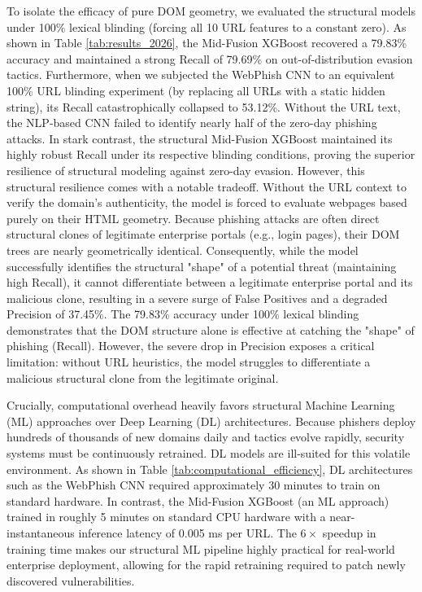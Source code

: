\documentclass[conference]{IEEEtran}
\begin{document}
To isolate the efficacy of pure DOM geometry, we evaluated the structural models under 100\% lexical blinding (forcing all 10 URL features to a constant zero). As shown in Table \ref{tab:results_2026}, the Mid-Fusion XGBoost recovered a 79.83\% accuracy and maintained a strong Recall of 79.69\% on out-of-distribution evasion tactics. Furthermore, when we subjected the WebPhish CNN to an equivalent 100\% URL blinding experiment (by replacing all URLs with a static hidden string), its Recall catastrophically collapsed to 53.12\%. Without the URL text, the NLP-based CNN failed to identify nearly half of the zero-day phishing attacks. In stark contrast, the structural Mid-Fusion XGBoost maintained its highly robust Recall under its respective blinding conditions, proving the superior resilience of structural modeling against zero-day evasion. However, this structural resilience comes with a notable tradeoff. Without the URL context to verify the domain's authenticity, the model is forced to evaluate webpages based purely on their HTML geometry. Because phishing attacks are often direct structural clones of legitimate enterprise portals (e.g., login pages), their DOM trees are nearly geometrically identical. Consequently, while the model successfully identifies the structural "shape" of a potential threat (maintaining high Recall), it cannot differentiate between a legitimate enterprise portal and its malicious clone, resulting in a severe surge of False Positives and a degraded Precision of 37.45\%. The 79.83\% accuracy under 100\% lexical blinding demonstrates that the DOM structure alone is effective at catching the "shape" of phishing (Recall). However, the severe drop in Precision exposes a critical limitation: without URL heuristics, the model struggles to differentiate a malicious structural clone from the legitimate original.

Crucially, computational overhead heavily favors structural Machine Learning (ML) approaches over Deep Learning (DL) architectures. Because phishers deploy hundreds of thousands of new domains daily and tactics evolve rapidly, security systems must be continuously retrained. DL models are ill-suited for this volatile environment. As shown in Table \ref{tab:computational_efficiency}, DL architectures such as the WebPhish CNN required approximately 30 minutes to train on standard hardware. In contrast, the Mid-Fusion XGBoost (an ML approach) trained in roughly 5 minutes on standard CPU hardware with a near-instantaneous inference latency of 0.005 ms per URL. The $6\times$ speedup in training time makes our structural ML pipeline highly practical for real-world enterprise deployment, allowing for the rapid retraining required to patch newly discovered vulnerabilities.
\end{document}
